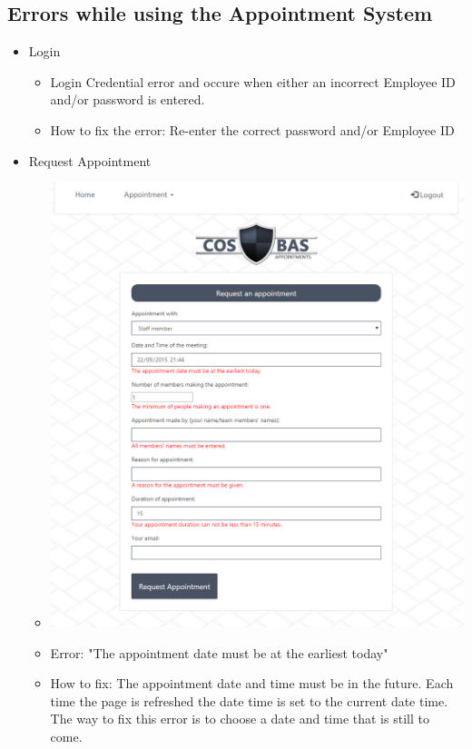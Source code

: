 \subsection{Errors while using the Appointment System}
	\begin{itemize}
		\item Login
			\begin{itemize}
				\item Login Credential error and occure when either an incorrect Employee ID  and/or password is entered. 
				\item How to fix the error: Re-enter the correct password and/or Employee ID
			\end{itemize}
		\item Request Appointment
			\begin{itemize}
				\item \includegraphics[width=\linewidth]{images/Screenshots/RequestAppoint_Errors.png}
				\item Error: "The appointment date must be at the earliest today"
				\item How to fix: The appointment date and time must be in the future. Each time the page is refreshed the date time is set to the current date time. The way to fix this error is to choose a date and time that is still to come. 

\end{itemize}
\end{itemize}
